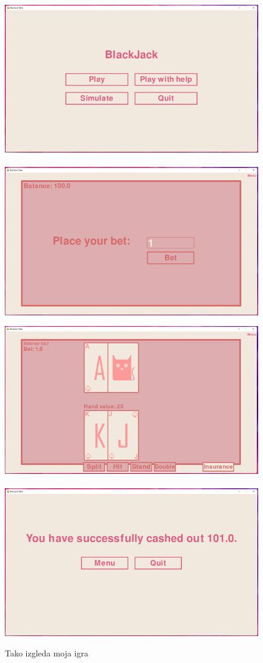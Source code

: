 \documentclass[a4paper, 16pt]{article}
\begin{document}
\begin{figure}[htbp]
\centering
{}
\includegraphics{meni.png}\,%
\includegraphics{bet.png}
  
\includegraphics{table.png}\,%
\includegraphics{cash_out.png}
\caption{Tako izgleda moja igra}
 \end{figure}
\end{document}
